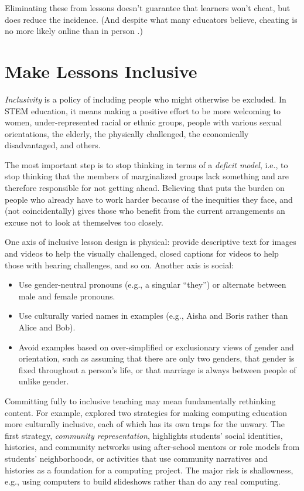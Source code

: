 \documentclass[10pt,letterpaper]{article}
\newcommand{\rulemajor}[1]{\section{#1}}
\begin{document}
Eliminating these from lessons doesn't guarantee that learners won't cheat, but
does reduce the incidence.  (And despite what many educators believe, cheating
is no more likely online than in person \cite{Beck2014}.)

\rulemajor{Make Lessons Inclusive}

\emph{Inclusivity} is a policy of including people who might otherwise be
excluded.  In STEM education, it means making a positive effort to be more
welcoming to women, under-represented racial or ethnic groups, people with
various sexual orientations, the elderly, the physically challenged, the
economically disadvantaged, and others.

The most important step is to stop thinking in terms of a \emph{deficit model},
i.e., to stop thinking that the members of marginalized groups lack something
and are therefore responsible for not getting ahead. Believing that puts the
burden on people who already have to work harder because of the inequities they
face, and (not coincidentally) gives those who benefit from the current
arrangements an excuse not to look at themselves too closely.

One axis of inclusive lesson design is physical: provide descriptive text for
images and videos to help the visually challenged, closed captions for videos to
help those with hearing challenges, and so on.  Another axis is social:

\begin{itemize}

\item Use gender-neutral pronouns (e.g., a singular ``they'') or alternate
  between male and female pronouns.

\item Use culturally varied names in examples (e.g., Aisha and Boris rather than
  Alice and Bob).

\item Avoid examples based on over-simplified or exclusionary views of gender
  and orientation, such as assuming that there are only two genders, that gender
  is fixed throughout a person's life, or that marriage is always between people
  of unlike gender.

\end{itemize}

Committing fully to inclusive teaching may mean fundamentally rethinking
content.  For example, \cite{Lach2018} explored two strategies for making
computing education more culturally inclusive, each of which has its own traps
for the unwary.  The first strategy, \emph{community representation}, highlights
students' social identities, histories, and community networks using
after-school mentors or role models from students' neighborhoods, or activities
that use community narratives and histories as a foundation for a computing
project.  The major risk is shallowness, e.g., using computers to build
slideshows rather than do any real computing.
\end{document}
